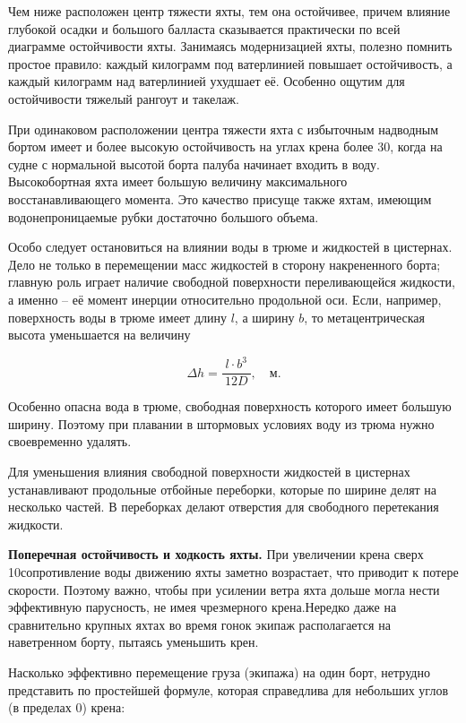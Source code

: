 Чем ниже расположен центр тяжести яхты, тем она остойчивее, причем
влияние глубокой осадки и большого балласта сказывается практически по
всей диаграмме остойчивости яхты. Занимаясь модернизацией яхты,
полезно помнить простое правило: каждый килограмм под ватерлинией
повышает остойчивость, а каждый килограмм над ватерлинией ухудшает
её. Особенно ощутим для остойчивости тяжелый рангоут и такелаж.

При одинаковом расположении центра тяжести яхта с избыточным надводным
бортом имеет и более высокую остойчивость на углах крена более 30\gr, когда на судне с нормальной высотой борта палуба начинает
входить в воду. Высокобортная яхта имеет большую величину
максимального восстанавливающего момента. Это качество присуще также
яхтам, имеющим водонепроницаемые рубки достаточно большого объема.

Особо следует остановиться на влиянии воды в трюме и жидкостей в
цистернах. Дело не только в перемещении масс жидкостей в сторону
накрененного борта; главную роль играет наличие свободной поверхности
переливающейся жидкости, а именно \--- её момент инерции относительно
продольной оси. Если, например, поверхность воды в трюме имеет длину
$l$, а ширину $b$, то метацентрическая высота уменьшается на величину

\begin{equation}
  \Delta h = \frac{l \cdot b^3}{\ 12D\ }, \quad \text{м.}
\end{equation}

Особенно опасна вода в трюме, свободная поверхность которого имеет
большую ширину. Поэтому при плавании в штормовых условиях воду из
трюма нужно своевременно удалять.

Для уменьшения влияния свободной поверхности жидкостей в цистернах
устанавливают продольные отбойные переборки,
которые по ширине делят на несколько частей. В переборках делают
отверстия для свободного перетекания жидкости.

\textbf{Поперечная остойчивость и ходкость яхты.}
 При увеличении крена
сверх 10\gr сопротивление воды движению яхты заметно
возрастает, что приводит к потере скорости. Поэтому важно, чтобы при
усилении ветра яхта дольше могла нести эффективную парусность, не имея
чрезмерного крена.Нередко даже на сравнительно крупных яхтах во время
гонок экипаж располагается на наветренном борту, пытаясь уменьшить
крен.

Насколько эффективно перемещение груза (экипажа) на один борт,
нетрудно представить по простейшей формуле, которая справедлива для
небольших углов (в пределах 0\gr) крена:


